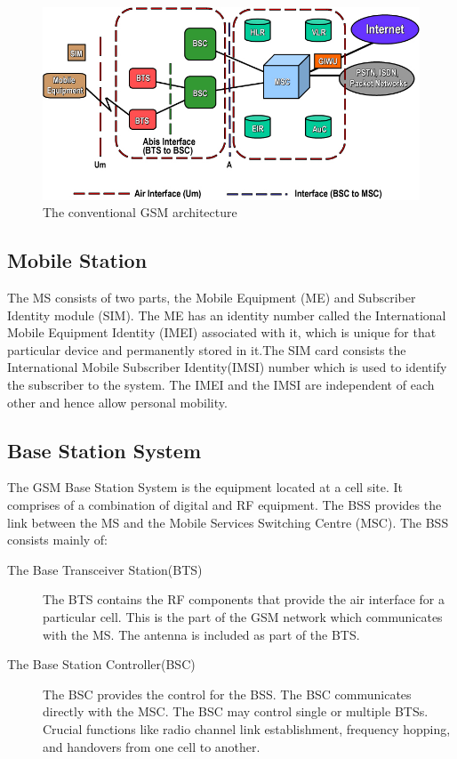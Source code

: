 \begin{figure}[h]
\centering
\includegraphics[width=1\textwidth]{gsmArch}
\caption{The conventional GSM architecture}
\label{gsmArch}
\end{figure}

\subsection{Mobile Station}
The MS consists of two parts, the Mobile Equipment (ME) and  Subscriber 
Identity module (SIM). The ME has an identity number called the International
 Mobile Equipment Identity (IMEI) associated with it, which is unique for 
that particular device and permanently stored in it.The SIM card consists 
the International Mobile Subscriber Identity(IMSI) number which is used 
to identify the subscriber to the system. The IMEI and the IMSI are independent 
of each other and hence allow personal mobility.

\subsection{Base Station System}
The GSM Base Station System is the equipment located at a cell site. It
comprises of a combination of digital and RF equipment. The BSS provides 
the link between the MS and the Mobile Services Switching Centre (MSC).
The BSS consists mainly of:
\begin{description}
	\item[The Base Transceiver Station(BTS)]  
	The BTS contains the RF components that provide the air interface for
 a particular cell. This is the part of the GSM network which communicates
 with the MS. The antenna is included as part of the BTS.
	\item[The Base Station Controller(BSC)]  
	The BSC  provides the control for the BSS. The BSC communicates directly 
with the MSC. The BSC may control single or multiple BTSs. Crucial functions 
like radio channel link establishment, frequency hopping, and handovers from
one cell to another.

\end{description}

